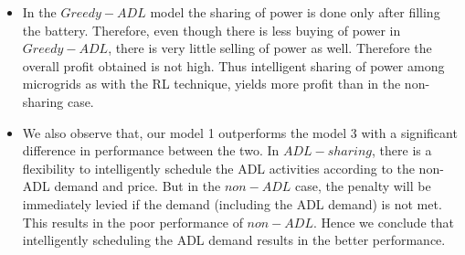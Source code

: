 \begin{itemize}

\item In the $Greedy-ADL$ model the sharing of power is done only after filling the battery. Therefore, even though there is less buying of power in $Greedy-ADL$, there is very little selling of power as well. Therefore the overall profit obtained is not high. Thus intelligent sharing of power among microgrids as with the RL technique, yields more profit than in the non-sharing case. 

\item We also observe that, our model 1 outperforms the model 3 with a significant difference in performance between the two. In $ADL-sharing$, there is a flexibility to intelligently schedule the ADL activities according to the non-ADL demand and price. But in the $non-ADL$ case, the penalty will be immediately levied if the demand (including the ADL demand) is not met. This results in the poor performance of $non-ADL$. Hence we conclude that intelligently scheduling the ADL demand results in the better performance.





\end{itemize}
